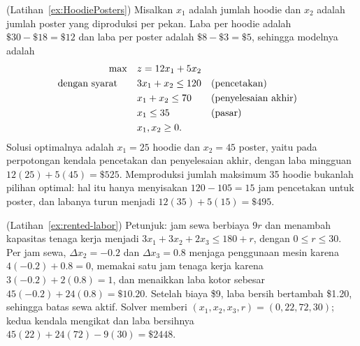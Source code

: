 \begin{solution}(Latihan~\ref{ex:HoodiePosters})
Misalkan $x_1$ adalah jumlah hoodie dan $x_2$ adalah jumlah poster yang diproduksi per pekan. Laba per hoodie adalah $\$30 - \$18 = \$12$ dan laba per poster adalah $\$8 - \$3 = \$5$, sehingga modelnya adalah
\begin{align*}
\max \quad & z = 12x_1 + 5x_2\\
\mbox{dengan syarat}\quad \quad & 3x_1 + x_2 \leq 120 && \mbox{(pencetakan)}\\
& x_1 + x_2 \leq 70 && \mbox{(penyelesaian akhir)}\\
& x_1 \leq 35 && \mbox{(pasar)}\\
& x_1, x_2 \geq 0.
\end{align*}
Solusi optimalnya adalah $x_1 = 25$ hoodie dan $x_2 = 45$ poster, yaitu pada perpotongan kendala pencetakan dan penyelesaian akhir, dengan laba mingguan $12(25) + 5(45) = \$525$. Memproduksi jumlah maksimum 35 hoodie bukanlah pilihan optimal: hal itu hanya menyisakan $120 - 105 = 15$ jam pencetakan untuk poster, dan labanya turun menjadi $12(35) + 5(15) = \$495$.
\end{solution}

\enlargethispage{2\baselineskip}
\begin{solution}(Latihan~\ref{ex:rented-labor})
Petunjuk: jam sewa berbiaya $9r$ dan menambah kapasitas tenaga kerja menjadi $3x_1 + 3x_2 + 2x_3 \leq 180 + r$, dengan $0 \leq r \leq 30$. Per jam sewa, $\Delta x_2=-0.2$ dan $\Delta x_3=0.8$ menjaga penggunaan mesin karena $4(-0.2)+0.8=0$, memakai satu jam tenaga kerja karena $3(-0.2)+2(0.8)=1$, dan menaikkan laba kotor sebesar $45(-0.2)+24(0.8)=\$10.20$. Setelah biaya \$9, laba bersih bertambah \$1.20, sehingga batas sewa aktif. Solver memberi $(x_1,x_2,x_3,r)=(0,22,72,30)$; kedua kendala mengikat dan laba bersihnya $45(22) + 24(72) - 9(30) = \$2448$.
\end{solution}
